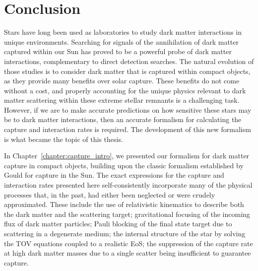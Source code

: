 
\chapter{Conclusion}
\label{chapter:conclusion}

Stars have long been used as laboratories to study dark matter interactions in unique environments. Searching for signals of the annihilation of dark matter captured within our Sun has proved to be a powerful probe of dark matter interactions, complementary to direct detection searches.
The natural evolution of those studies is to consider dark matter that is captured within compact objects, as they provide many benefits over solar capture. These benefits do not come without a cost, and properly accounting for the unique physics relevant to dark matter scattering within these extreme stellar remnants is a challenging task. However, if we are to make accurate predictions on how sensitive these stars may be to dark matter interactions, then an accurate formalism for calculating the capture and interaction rates is required. The development of this new formalism is what became the topic of this thesis.


In Chapter~\ref{chapter:capture_intro}, we presented our formalism for dark matter capture in compact objects,  building upon the classic formalism established by Gould for capture in the Sun. The exact expressions for the capture and interaction rates presented here self-consistently incorporate many of the physical processes that, in the past, had either been neglected or were crudely approximated. These include the use of relativistic kinematics to describe both the dark matter and the scattering target; gravitational focusing of the incoming flux of dark matter particles; Pauli blocking of the final state target due to scattering in a degenerate medium; the internal structure of the star by solving the TOV equations coupled to a realistic EoS; the suppression of the capture rate at high dark matter masses due to a single scatter being insufficient to guarantee capture. 


